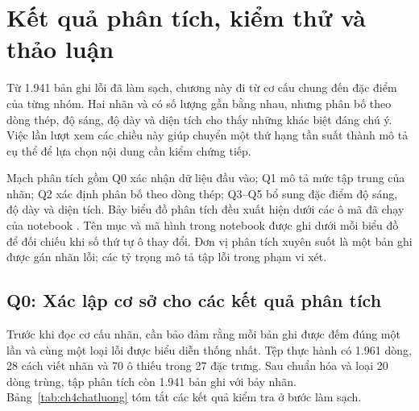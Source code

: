 \chapter{Kết quả phân tích, kiểm thử và thảo luận}
\label{chap:ketqua}

Từ 1.941 bản ghi lỗi đã làm sạch, chương này đi từ cơ cấu chung đến đặc điểm của từng nhóm. Hai nhãn  và  có số lượng gần bằng nhau, nhưng phân bố theo dòng thép, độ sáng, độ dày và diện tích cho thấy những khác biệt đáng chú ý. Việc lần lượt xem các chiều này giúp chuyển một thứ hạng tần suất thành mô tả cụ thể để lựa chọn nội dung cần kiểm chứng tiếp.

Mạch phân tích gồm Q0 xác nhận dữ liệu đầu vào; Q1 mô tả mức tập trung của nhãn; Q2 xác định phân bố theo dòng thép; Q3--Q5 bổ sung đặc điểm độ sáng, độ dày và diện tích. Bảy biểu đồ phân tích đều xuất hiện dưới các ô mã đã chạy của notebook . Tên mục và mã hình trong notebook được ghi dưới mỗi biểu đồ để đối chiếu khi số thứ tự ô thay đổi. Đơn vị phân tích xuyên suốt là một bản ghi được gán nhãn lỗi; các tỷ trọng mô tả tập lỗi trong phạm vi xét.

\section{Q0: Xác lập cơ sở cho các kết quả phân tích}
\label{sec:ch4q0}

Trước khi đọc cơ cấu nhãn, cần bảo đảm rằng mỗi bản ghi được đếm đúng một lần và cùng một loại lỗi được biểu diễn thống nhất. Tệp thực hành có 1.961 dòng, 28 cách viết nhãn và 70 ô thiếu trong 27 đặc trưng. Sau chuẩn hóa và loại 20 dòng trùng, tập phân tích còn 1.941 bản ghi với bảy nhãn. Bảng~\ref{tab:ch4chatluong} tóm tắt các kết quả kiểm tra ở bước làm sạch.

